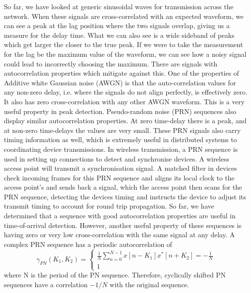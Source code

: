 \documentclass[]{final_report}
\begin{document}
So far, we have looked at generic sinusoidal waves for transmission across the network. When these signals are cross-correlated with an expected waveform, we can see a peak at the lag position where the two signals overlap, giving us a measure for the delay time. What we can also see is a wide sideband of peaks which get larger the closer to the true peak. If we were to take the measurement for the lag be the maximum value of the waveform, we can see how a noisy signal could lead to incorrectly choosing the maximum. 
There are signals with autocorrelation properties which mitigate against this.  One of the properties of Additive white Gaussian noise (AWGN) is that the auto-correlation values for any non-zero delay, i.e. where the signals do not align perfectly, is effectively zero. It also has zero cross-correlation with any other AWGN waveform. This is a very useful property in peak detection. Pseudo-random noise (PRN) sequences also display similar autocorrelation properties. At zero time-delay there is a peak, and at non-zero time-delays the values are very small.  These PRN signals also carry timing information as well, which is extremely useful in distributed systems to coordinating device transmissions.
In wireless transmission, a PRN sequence is used in setting up connections to detect and synchronise devices. A wireless access point will transmit a synchronisation signal. A matched filter in devices check incoming frames for this PRN sequence and aligns its local clock to the access point’s and sends back a signal, which the access point then scans for the PRN sequence, detecting the devices timing and instructs the device to adjust its transmit timing to account for round trip propagation. 
So far, we have determined that a sequence with good autocorrelation properties are useful in time-of-arrival detection. However, another useful property of these sequences is having zero or very low cross-correlation with the same signal at any delay. A complex PRN sequence has a periodic autocorrelation of 
\[ 
\gamma_{PN}\left(K_1,K_2\right) = 
\begin{cases}
\frac{1}{N} \sum_{n=0}^{N-1}{x\left[n-K_1\right]x^\ast\left[n+K_2\right]} = - \frac{1}{N} \\
1
\end{cases}
\] 
where N is the period of the PN sequence. Therefore, cyclically shifted PN sequences have a correlation $-1/N$ with the original sequence. 
	

	
	
\end{document}

